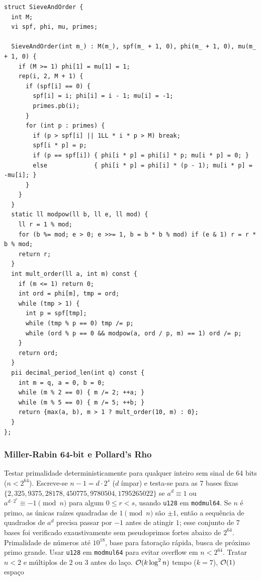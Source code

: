 \begin{lstlisting}
struct SieveAndOrder {
  int M;
  vi spf, phi, mu, primes;

  SieveAndOrder(int m_) : M(m_), spf(m_ + 1, 0), phi(m_ + 1, 0), mu(m_ + 1, 0) {
    if (M >= 1) phi[1] = mu[1] = 1;
    rep(i, 2, M + 1) {
      if (spf[i] == 0) {
        spf[i] = i; phi[i] = i - 1; mu[i] = -1;
        primes.pb(i);
      }
      for (int p : primes) {
        if (p > spf[i] || 1LL * i * p > M) break;
        spf[i * p] = p;
        if (p == spf[i]) { phi[i * p] = phi[i] * p; mu[i * p] = 0; }
        else             { phi[i * p] = phi[i] * (p - 1); mu[i * p] = -mu[i]; }
      }
    }
  }
  static ll modpow(ll b, ll e, ll mod) {
    ll r = 1 % mod;
    for (b %= mod; e > 0; e >>= 1, b = b * b % mod) if (e & 1) r = r * b % mod;
    return r;
  }
  int mult_order(ll a, int m) const {
    if (m <= 1) return 0;
    int ord = phi[m], tmp = ord;
    while (tmp > 1) {
      int p = spf[tmp];
      while (tmp % p == 0) tmp /= p;
      while (ord % p == 0 && modpow(a, ord / p, m) == 1) ord /= p;
    }
    return ord;
  }
  pii decimal_period_len(int q) const {
    int m = q, a = 0, b = 0;
    while (m % 2 == 0) { m /= 2; ++a; }
    while (m % 5 == 0) { m /= 5; ++b; }
    return {max(a, b), m > 1 ? mult_order(10, m) : 0};
  }
};
\end{lstlisting}

\subsubsection{Miller-Rabin 64-bit e Pollard's Rho}
\algobox
  {Testar primalidade deterministicamente para qualquer inteiro sem sinal de 64 bits ($n < 2^{64}$).}
  {Escreve-se $n - 1 = d \cdot 2^s$ ($d$ ímpar) e testa-se para as 7 bases fixas $\{2, 325, 9375, 28178, 450775, 9780504, 1795265022\}$ se $a^d \equiv 1$ ou $a^{d \cdot 2^r} \equiv -1 \pmod n$ para algum $0 \le r < s$, usando \texttt{u128} em \texttt{modmul64}.}
  {Se $n$ é primo, as únicas raízes quadradas de $1 \pmod n$ são $\pm 1$, então a sequência de quadrados de $a^d$ precisa passar por $-1$ antes de atingir $1$; esse conjunto de 7 bases foi verificado exaustivamente sem pseudoprimos fortes abaixo de $2^{64}$.}
  {Primalidade de números até $10^{18}$, base para fatoração rápida, busca de próximo primo grande.}
  {Usar \texttt{u128} em \texttt{modmul64} para evitar overflow em $n < 2^{64}$. Tratar $n < 2$ e múltiplos de $2$ ou $3$ antes do laço.}
  {$\mathcal{O}(k \log^2 n)$ tempo ($k = 7$), $\mathcal{O}(1)$ espaço}

